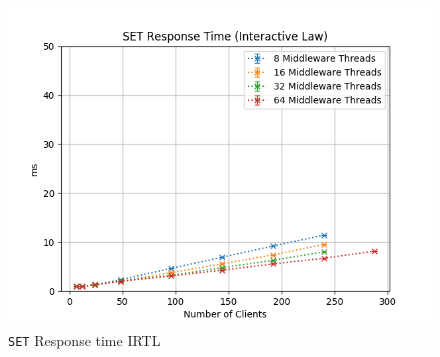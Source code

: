 \documentclass[11pt,a4paper]{article}
\begin{document}
%
\begin{figure}[H]
	\centering
	\captionsetup{width=0.4\textwidth}
    \begin{minipage}{0.5\textwidth}
        \includegraphics[width=\textwidth]{../illustrations/plots/2_2_two_middlewares/1-0/middleware_interactive_set_rt_ms.png}
        \caption{\texttt{SET} Response time IRTL}
        \label{fig:two_middlewares_set_rt_it}
    \end{minipage}\hfill
\end{figure}
%
\end{document}
